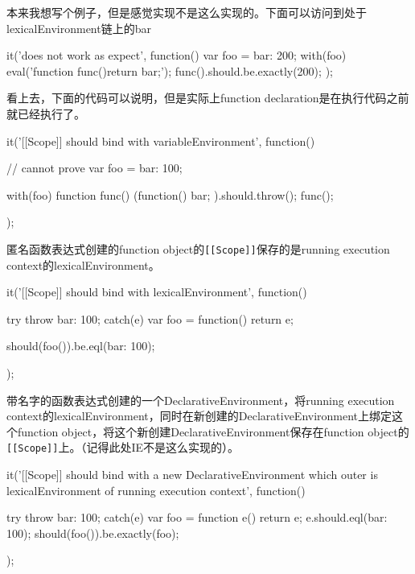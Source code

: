 本来我想写个例子，但是感觉实现不是这么实现的。下面可以访问到处于lexicalEnvironment链上的bar
\begin{JavaScript}
		it('does not work as expect', function(){
			var foo = {bar: 200};
			with(foo) {
				eval('function func(){return bar;}');
			}
			func().should.be.exactly(200);
		});
\end{JavaScript}
看上去，下面的代码可以说明，但是实际上function declaration是在执行代码之前就已经执行了。
\begin{JavaScript}
		it('[[Scope]] should bind with variableEnvironment', function(){
			// cannot prove
			var foo = {bar: 100};

			with(foo) {
				function func() {
					(function(){
						bar;
					}).should.throw();
				}
			}
			func();
		});
\end{JavaScript}

匿名函数表达式创建的function object的\lstinline![[Scope]]!保存的是running execution context的lexicalEnvironment。
\begin{JavaScript}
		it('[[Scope]] should bind with lexicalEnvironment', function(){

			try {
				throw {bar: 100};
			} catch(e) {
				var foo = function(){
					return e;
				}
			}

			should(foo()).be.eql({bar: 100});
		});
\end{JavaScript}

带名字的函数表达式创建的一个DeclarativeEnvironment，将running execution context的lexicalEnvironment，同时在新创建的DeclarativeEnvironment上绑定这个function object，将这个新创建DeclarativeEnvironment保存在function object的\lstinline![[Scope]]!上。（记得此处IE不是这么实现的）。

\begin{JavaScript}
		it('[[Scope]] should bind with a new DeclarativeEnvironment which outer is lexicalEnvironment of running execution context', function(){

			try {
				throw {bar: 100};
			} catch(e) {
				var foo = function e() {
					return e;
				}
				e.should.eql({bar: 100});
			}
			should(foo()).be.exactly(foo);
		});	
\end{JavaScript}


